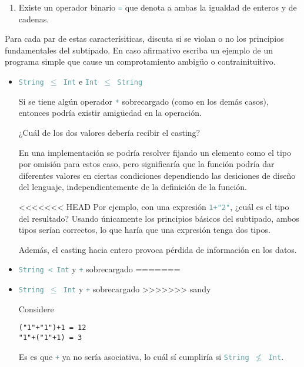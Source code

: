 \documentclass{article}
\newcommand{\tp}[1]{\textcolor{CadetBlue} {\texttt{#1}}}
\begin{document}
\begin{enumerate}
\begin{enumerate}
            \item Existe un operador binario \tp{=} que denota a ambas la
            igualdad de enteros y de cadenas.
        \end{enumerate}

        Para cada par de estas caracterísiticas, discuta si se violan o no los
        principios fundamentales del subtipado. En caso afirmativo escriba un
        ejemplo de un programa simple que cause un comprotamiento ambigüo o
        contrainituitivo.

        \begin{itemize}
            \item \tp{String $\leq$ Int} e \tp{Int $\leq$ String}

            Si se tiene algún operador \tp{*} sobrecargado (como en los demás
            casos), entonces podría existir amigüedad en la operación.

            ¿Cuál de los dos valores debería recibir el casting?

            En una implementación se podría resolver fijando un elemento como el
            tipo por omisión para estos caso, pero significaría que la función
            podría dar diferentes valores en ciertas condiciones dependiendo las
            desiciones de diseño del lenguaje, independientemente de la
            definición de la función.

<<<<<<< HEAD
            Por ejemplo, con una expresión \tp{1+"2"}, ¿cuál es el tipo del
            resultado? Usando únicamente los principios básicos del subtipado, 
            ambos tipos serían correctos, lo que haría que una expresión tenga 
            dos tipos.

            Además, el casting hacia entero provoca pérdida de información en 
            los datos.

            \item \tp{String < Int} y \tp{+} sobrecargado
=======
            \item \tp{String $\leq$ Int} y \tp{+} sobrecargado
>>>>>>> sandy

            Considere

            \begin{verbatim}
("1"+"1")+1 = 12
"1"+("1"+1) = 3
            \end{verbatim}

            Es es que \tp{+} ya no sería asociativa, lo cuál sí cumpliría si
            \tp{String $\not \leq$ Int}.


\end{itemize}
\end{enumerate}
\end{document}

